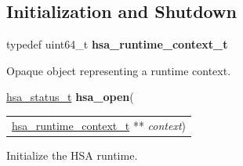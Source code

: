 \documentclass[final]{book}
\newcommand{\hsaarg}[1]{\textit{#1}}
\begin{document}
\begin{appendices}
\section{Initialization and Shutdown}
\makeatletter{}

\noindent\begin{tcolorbox}[nobeforeafter,arc=0mm,colframe=white,colback=lightgray,left=0mm]
typedef uint64_t  \hypertarget{group--context-1ga0296b674c03f1a65fa8ef91e2f0ad44d}{\textbf{hsa_runtime_context_t}}
\end{tcolorbox}
Opaque object representing a runtime context.
\\

\noindent\begin{tcolorbox}[breakable,nobeforeafter,colframe=white,colback=lightgray,left=0mm]
\hyperlink{group--status-1gad755322e7ff95456520e8abdbe90d225}{hsa_status_t} \hypertarget{group--context-1gab45607a30ab05c95dfe692115fe1f2a4}{\textbf{hsa_open}}(
\vspace{-3.5mm}\begin{longtable}{@{}p{\textwidth}}
\hspace{1.7em}\hyperlink{group--context-1ga0296b674c03f1a65fa8ef91e2f0ad44d}{hsa_runtime_context_t} ** \hsaarg{context})\end{longtable}

\end{tcolorbox}
Initialize the HSA runtime.


\end{appendices}
\end{document}
